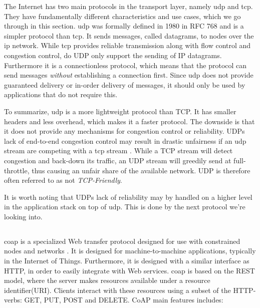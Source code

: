 The Internet has two main protocols in the transport layer, namely \gls{udp} and
\gls{tcp}. They have fundamentally different characteristics and use cases,
which we go through in this section. \gls{udp} was formally defined in 1980 in
RFC 768\cite{rfc-udp} and is a simpler protocol than \gls{tcp}. It sends
messages, called datagrams, to nodes over the \gls{ip} network. While \gls{tcp}
provides reliable transmission along with flow control and congestion control,
do UDP only support the sending of IP datagrams. Furthermore it is a
connectionless protocol, which means that the protocol can send messages
\textit{without} establishing a connection first. Since \gls{udp} does not
provide guaranteed delivery or in-order delivery of messages, it should only be
used by applications that do not require this.

To summarize, \gls{udp} is a more lightweight protocol than TCP. It has smaller
headers and less overhead, which makes it a faster protocol. The downside is
that it does not provide any mechanisms for congestion control or reliability.
UDPs lack of end-to-end congestion control may result in drastic unfairness if
an \gls{udp} stream are competing with a \gls{tcp}
stream \cite{floyd-congestion}. While a TCP stream will detect congestion and
back-down its traffic, an UDP stream will greedily send at full-throttle, thus
causing an unfair share of the available network. UDP is therefore often
referred to as not \textit{TCP-Friendly}.

 It is worth noting that UDPs lack of reliability may by handled on a higher
 level in the application stack on top of \gls{udp}. This is done by the next
 protocol we're looking into.

\subsection{}

\gls{coap} is a specialized Web transfer protocol designed for use with
constrained nodes and  networks \cite{rfc-7252}. It is designed for
machine-to-machine applications, typically in the Internet of Things.
Furthermore, it is designed with a similar interface as HTTP, in order to easily
integrate with Web services. \gls{coap} is based on the REST model, where the
server makes resources available  under a resource identifier(URI). Clients
interact with these resources using a subset of the HTTP-verbs: GET, PUT, POST and
DELETE. CoAP main features includes:

